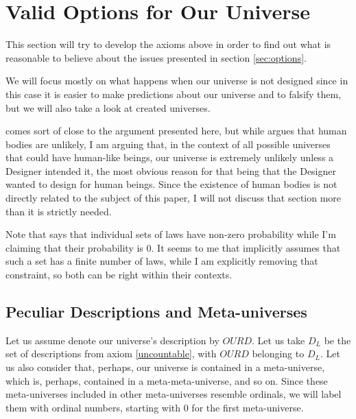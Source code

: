 \documentclass[a4paper
,draft
]{article}
\def\descriptions{D_L}
\def\our_description{OURD}
\newcommand{\paper}[1]{paper}
\newcommand{\ghilimele}[1]{``#1"}
\begin{document}
\section{Valid Options for Our Universe}
\label{sec:valid-options}

This section will try to develop the axioms above in order to find out what
is reasonable to believe about the issues presented in
section \ref{sec:options}.

We will focus mostly on what happens when our universe is not designed
since in this case it is easier to make predictions about our universe
and to falsify them, but we will also take a look at created universes.

\textcite[][Section \ghilimele{Why a world with human bodies is unlikely
if there is no God}]{Swinburne2003} comes sort of close to the argument
presented here, but while \citeauthor{Swinburne2003}
argues that human bodies are unlikely, I am arguing that, in the context
of all possible universes that could have human-like beings,
our universe is extremely unlikely unless a Designer intended it, the most
obvious reason for that being that the Designer wanted to design for human
beings.
Since the existence of human bodies is not directly related to the subject
of this \paper{}, I will not discuss that section more
than it is strictly needed.

Note that  \citeauthor{Swinburne2003} says that individual sets of laws
have non-zero probability while I'm claiming that their probability is $0$.
It seems to me that \citeauthor{Swinburne2003} implicitly assumes that
such a set has a finite number of laws, while I am explicitly removing
that constraint, so both can be right within their contexts.

\subsection{Peculiar Descriptions and Meta-universes}
\label{fdaumu}

Let us assume denote our universe's description by
$\our_description$. Let us take $\descriptions$ be the set of descriptions from
axiom \ref{uncountable}, with $\our_description$ belonging to $\descriptions$.
Let us also consider that, perhaps, our universe is contained
in a meta-universe, which is, perhaps, contained in
a meta-meta-universe, and so on. Since these meta-universes included in other
meta-universes resemble ordinals, we will label them with ordinal numbers,
starting with $0$ for the first meta-universe.
\end{document}
